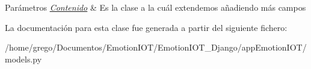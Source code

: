 \begin{DoxyParams}{Parámetros}
{\em \hyperlink{classappEmotionIOT_1_1models_1_1Contenido}{Contenido}} & Es la clase a la cuál extendemos añadiendo más campos \\
\hline
\end{DoxyParams}


La documentación para esta clase fue generada a partir del siguiente fichero\+:\begin{DoxyCompactItemize}
\item 
/home/grego/\+Documentos/\+Emotion\+I\+O\+T/\+Emotion\+I\+O\+T\+\_\+\+Django/app\+Emotion\+I\+O\+T/models.\+py\end{DoxyCompactItemize}
